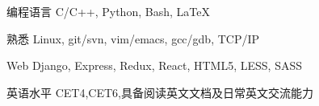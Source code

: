 

\begin{cvskills}

  \cvskill
    {编程语言} %
    {C/C++, Python, Bash, \LaTeX} %

  \cvskill
    {熟悉} %
    {Linux, git/svn, vim/emacs, gcc/gdb, TCP/IP} %

  \cvskill
    {Web} %
    {Django, Express, Redux, React, HTML5, LESS, SASS} %

  \cvskill
    {英语水平} %
    {CET4,CET6,具备阅读英文文档及日常英文交流能力} %

\end{cvskills}
